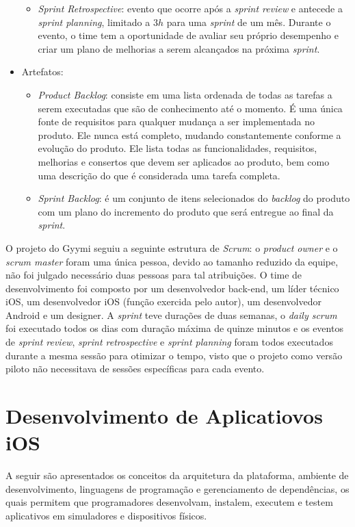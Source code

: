 \begin{itemize}
\begin{itemize}
        \item \textit{Sprint Retrospective}: evento que ocorre após a \textit{sprint review} e antecede a \textit{sprint planning}, limitado a $3h$ para uma \textit{sprint} de um mês. Durante o evento, o time tem a oportunidade de avaliar seu próprio desempenho e criar um plano de melhorias a serem alcançados na próxima \textit{sprint}.
    \end{itemize}
    \item Artefatos:
    \begin{itemize}
        \item \textit{Product Backlog}: consiste em uma lista ordenada de todas as tarefas a serem executadas que são de conhecimento até o momento. É uma única fonte de requisitos para qualquer mudança a ser implementada no produto. Ele nunca está completo, mudando constantemente conforme a evolução do produto. Ele lista todas as funcionalidades, requisitos, melhorias e consertos que devem ser aplicados ao produto, bem como uma descrição do que é considerada uma tarefa completa.
        \item \textit{Sprint Backlog}: é um conjunto de itens selecionados do \textit{backlog} do produto com um plano do incremento do produto que será entregue ao final da \textit{sprint}.
    \end{itemize}
\end{itemize}

O projeto do Gyymi seguiu a seguinte estrutura de \textit{Scrum}: o \textit{product owner} e o \textit{scrum master} foram uma única pessoa, devido ao tamanho reduzido da equipe, não foi julgado necessário duas pessoas para tal atribuições. O time de desenvolvimento foi composto por um desenvolvedor back-end, um líder técnico iOS, um desenvolvedor iOS (função exercida pelo autor), um desenvolvedor Android e um designer. A \textit{sprint} teve durações de duas semanas, o \textit{daily scrum} foi executado todos os dias com duração máxima de quinze minutos e os eventos de \textit{sprint review}, \textit{sprint retrospective} e \textit{sprint planning} foram todos executados durante a mesma sessão para otimizar o tempo, visto que o projeto como versão piloto não necessitava de sessões específicas para cada evento.

\section{Desenvolvimento de Aplicatiovos iOS}
A seguir são apresentados os conceitos da arquitetura da plataforma, ambiente de desenvolvimento, linguagens de programação e gerenciamento de dependências, os quais permitem que programadores desenvolvam, instalem, executem e testem aplicativos em simuladores e dispositivos físicos.

